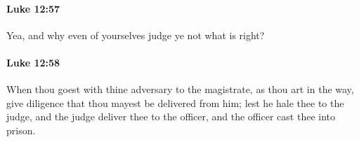 		\paragraph{Luke 12:57} %
			\label{LUKE-12-57}

			Yea, and why even of yourselves judge ye not what is right?

			\begin{framed}
			\scriptsize
				\begin{compactdesc}
					\item[SBLG] 
				\end{compactdesc}
			\end{framed}

		\paragraph{Luke 12:58} %
			\label{LUKE-12-58}

			When thou goest with thine adversary to the magistrate, as thou art in the way, give diligence that thou mayest be delivered from him; lest he hale thee to the judge, and the judge deliver thee to the officer, and the officer cast thee into prison.

